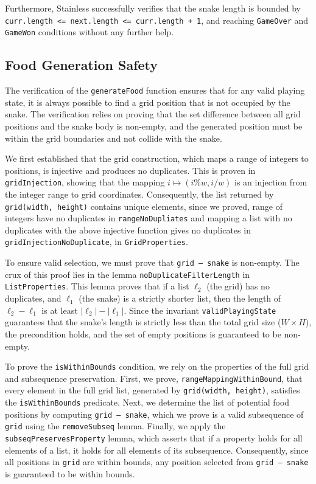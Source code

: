 \documentclass[letterpaper, 11pt]{article}
\begin{document}
Furthermore, Stainless successfully verifies that the snake length is bounded by \newline
\texttt{curr.length <= next.length <= curr.length + 1}, and reaching
\texttt{GameOver} and \texttt{GameWon} conditions without any further help.

\subsection{Food Generation Safety}
The verification of the \texttt{generateFood} function ensures that for any valid playing
state, it is always possible to find a grid position that is not occupied by the snake.
The verification relies on proving that the set difference between all grid positions and the snake
body is non-empty, and the generated position must be within the grid boundaries and not collide
with the snake.

We first established that the grid construction, which maps a range of integers to positions, is
injective and produces no duplicates. This is proven in \texttt{gridInjection},
showing that the mapping $i \mapsto (i \% w, i / w)$ is an injection from the integer range to
grid coordinates.
Consequently, the list returned by \texttt{grid(width, height)} contains unique elements,
since we proved, range of integers have no duplicates in \texttt{rangeNoDupliates} and
mapping a list with no duplicates with the above injective function gives no duplicates in
\texttt{gridInjectionNoDuplicate}, in \texttt{GridProperties}.

To ensure valid selection, we must prove that \texttt{grid -- snake} is non-empty.
The crux of this proof lies in the lemma \texttt{noDuplicateFilterLength} in
\texttt{ListProperties}. This lemma proves that if a list $\ell_{2}$ (the grid) has no duplicates,
and $\ell_{1}$ (the snake) is a strictly shorter list, then the length of $\ell_{2} - \ell_{1}$ is
at least $|\ell_{2}| - |\ell_{1}|$. Since the invariant \texttt{validPlayingState}
guarantees that the snake's length is strictly less than the total grid size ($W \times H$), the
precondition holds, and the set of empty positions is guaranteed to be non-empty.

To prove the \texttt{isWithinBounds} condition, we rely on the properties of the full
grid and subsequence preservation.
First, we prove, \texttt{rangeMappingWithinBound}, that every element in the full grid
list, generated by \texttt{grid(width, height)}, satisfies the
\texttt{isWithinBounds} predicate.
Next, we determine the list of potential food positions by computing \texttt{grid --
snake}, which we prove is a valid subsequence of \texttt{grid} using the
\texttt{removeSubseq} lemma.
Finally, we apply the \texttt{subseqPreservesProperty} lemma, which asserts that if a
property holds for all elements of a list, it holds for all elements of its subsequence.
Consequently, since all positions in \texttt{grid} are within bounds, any position selected from
\texttt{grid -- snake} is guaranteed to be within bounds.
\end{document}
